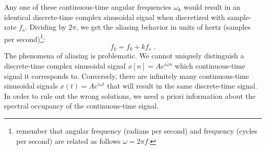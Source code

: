 Any one of these continuous-time angular frequencies $\omega_k$ would
result in an identical discrete-time complex sinusoidal signal when
discretized with sample-rate $f_s$. Dividing by
$2\pi$, we get the aliasing behavior in units of hertz (samples per
second)\footnote{remember that angular frequency (radians per second)
  and frequency (cycles per second) are related as follows $\omega = 2\pi
    f$.}:
\begin{equation}
  \boxed{
    f_k = f_0 + k f_s
  }\,\,.
\end{equation}
The phenomena of aliasing is problematic. We cannot uniquely distinguish
a discrete-time complex sinusoidal signal $x[n]=Ae^{i\hat{\omega}n}$
which continuous-time signal it corresponds to. Conversely,
there are infinitely many continuous-time sinusoidal signals
$x(t)=Ae^{i\omega t}$ that will result in the same discrete-time
signal. In order to rule out the wrong solutions, we need a priori
information about the spectral occupancy of the continuous-time
signal.

